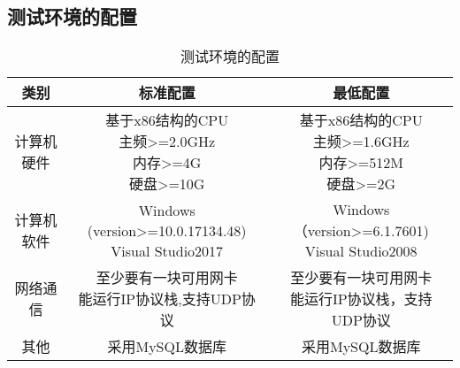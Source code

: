 \subsection{测试环境的配置}
\begin{table}[htbp]
\centering
\caption{测试环境的配置} \label{tab:test-environment}
\begin{tabular}{|c|c|c|}
    \hline
    类别 & 标准配置 & 最低配置 \\
    \hline
    计算机硬件 & \tabincell{c}{基于x86结构的CPU\\ 主频>=2.0GHz\\ 内存>=4G\\ 硬盘>=10G} & \tabincell{c}{基于x86结构的CPU\\ 主频>=1.6GHz\\ 内存>=512M\\ 硬盘>=2G} \\
    \hline
    计算机软件 & \tabincell{c}{Windows (version>=10.0.17134.48)\\ Visual Studio2017} & \tabincell{c}{Windows（version>=6.1.7601)\\     Visual Studio2008} \\
    \hline
    网络通信 & \tabincell{c}{至少要有一块可用网卡\\ 能运行IP协议栈,支持UDP协议} & \tabincell{c}{至少要有一块可用网卡\\ 能运行IP协议栈，支持UDP协议} \\
    \hline
    其他 & 采用MySQL数据库 & 采用MySQL数据库 \\
    \hline

\end{tabular}
\end{table}

